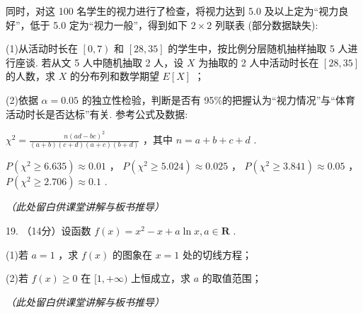 \documentclass[10pt]{article}
\newcommand{\largeboardspace}{%
  \par\vspace{8cm}
  \hfill\textit{（此处留白供课堂讲解与板书推导）}
  \par\vspace{1cm}
}
\newcommand*\circled[1]{\tikz[baseline=(char.base)]{\node[shape=circle,draw,inner sep=1.5pt] (char) {\small #1};}}
\begin{document}
同时，对这 100 名学生的视力进行了检查，将视力达到 5.0 及以上定为``视力良好''，低于 5.0 定为``视力一般''，得到如下 \(2 \times  2\) 列联表 (部分数据缺失):

\begin{center}
\end{center}

(1)从活动时长在 \(\left\lbrack  {0,7}\right)\) 和 \(\left\lbrack  {{28},{35}}\right\rbrack\) 的学生中，按比例分层随机抽样抽取 5 人进行座谈. 若从文 5 人中随机抽取 2 人，设 \(X\) 为抽取的 2 人中活动时长在 \(\left\lbrack  {{28},{35}}\right\rbrack\) 的人数，求 \(X\) 的分布列和数学期望 \(E\left\lbrack  X\right\rbrack\) ；

(2)依据 \(\alpha  = {0.05}\) 的独立性检验，判断是否有 95\%的把握认为``视力情况''与``体育活动时长是否达标''有关. 参考公式及数据:

\circled{1} \({\chi }^{2} = \frac{n{\left( ad - bc\right) }^{2}}{\left( {a + b}\right) \left( {c + d}\right) \left( {a + c}\right) \left( {b + d}\right) }\) ，其中 \(n = a + b + c + d\) .

\circled{2} \(P\left( {{\chi }^{2} \geq  {6.635}}\right)  \approx  {0.01}\) ， \(P\left( {{\chi }^{2} \geq  {5.024}}\right)  \approx  {0.025}\) ， \(P\left( {{\chi }^{2} \geq  {3.841}}\right)  \approx  {0.05}\) ， \(P\left( {{\chi }^{2} \geq  {2.706}}\right)  \approx  {0.1}\) .

\largeboardspace

\newpage

19. （14分）设函数 \(f\left( x\right)  = {x}^{2} - x + a\ln x,a \in  \mathbf{R}\) .

(1)若 \(a = 1\) ，求 \(f\left( x\right)\) 的图象在 \(x = 1\) 处的切线方程；

(2)若 \(f\left( x\right)  \geq  0\) 在 \(\lbrack 1, + \infty )\) 上恒成立，求 \(a\) 的取值范围；

\largeboardspace

\newpage
\end{document}
